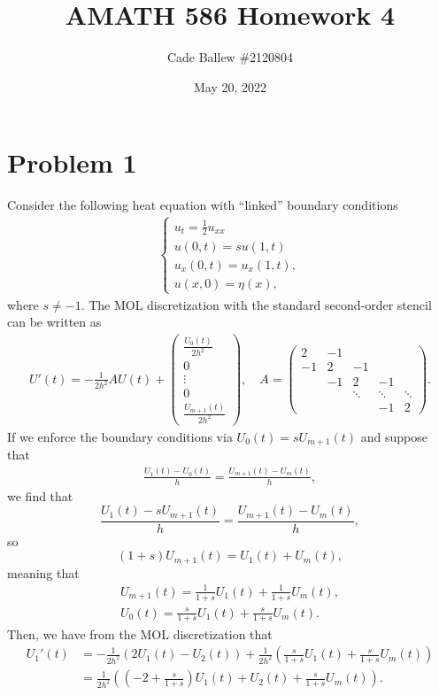 \documentclass{article}
\title{AMATH 586 Homework 4}
\author{Cade Ballew \#2120804}
\date{May 20, 2022}
\begin{document}
	
\maketitle
	
\section{Problem 1}
Consider the following heat equation with ``linked'' boundary conditions
\begin{align*}
	\begin{cases}
		u_t = \frac 1 2 u_{xx}\\
		u(0,t) = s u(1,t)\\
		u_x(0,t) = u_x(1,t),\\
		u(x,0) = \eta(x),
	\end{cases}
\end{align*}
where $s \neq -1$.   The MOL discretization with the standard second-order stencil can be written as
\begin{align*}
	U'(t) = -\frac{1}{2h^2} A U(t) + \begin{pmatrix} \frac{U_0(t)}{2h^2} \\ 0 \\ \vdots \\ 0 \\ \frac{U_{m+1}(t)}{2h^2} \end{pmatrix}, \quad A = \begin{pmatrix}
		2  & -1\\
		-1 & 2 & -1 \\
		& -1 & 2 & -1\\
		&& \ddots & \ddots & \ddots \\
		&&& -1 & 2 \end{pmatrix}.
\end{align*}
If we enforce the boundary conditions via $U_0(t) = s U_{m+1}(t)$ and suppose that
\begin{align*}
	\frac{U_{1}(t) - U_0(t)}{h} = \frac{U_{m+1}(t) - U_m(t)}{h},
\end{align*}
we find that 
\[
\frac{U_{1}(t) - sU_{m+1}(t)}{h} = \frac{U_{m+1}(t) - U_m(t)}{h},
\]
so
\[
(1+s)U_{m+1}(t)=U_1(t)+U_m(t),
\]
meaning that 
\begin{align*}
U_{m+1}(t)=\frac{1}{1+s}U_1(t)+\frac{1}{1+s}U_m(t),\\
U_{0}(t)=\frac{s}{1+s}U_1(t)+\frac{s}{1+s}U_m(t).
\end{align*}
Then, we have from the MOL discretization that
\begin{align*}
U_1'(t)&=-\frac{1}{2h^2}(2U_1(t)-U_2(t))+\frac{1}{2h^2}\left(\frac{s}{1+s}U_1(t)+\frac{s}{1+s}U_m(t)\right)\\&=\frac{1}{2h^2}\left(\left(-2+\frac{s}{1+s}\right)U_1(t)+U_2(t)+\frac{s}{1+s}U_m(t)\right).
\end{align*}
\end{document}
